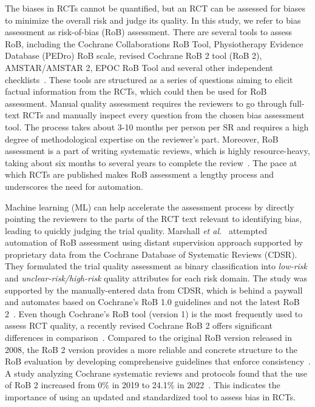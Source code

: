 \documentclass[sn-mathphys,Numbered]{sn-jnl}%
\theoremstyle{thmstyleone}%
\theoremstyle{thmstyletwo}%
\theoremstyle{thmstylethree}%
\begin{document}
The biases in RCTs cannot be quantified, but an RCT can be assessed for biases to minimize the overall risk and judge its quality.
In this study, we refer to bias assessment as risk-of-bias (RoB) assessment.
There are several tools to assess RoB, including the Cochrane Collaborations RoB Tool, Physiotherapy Evidence Database (PEDro) RoB scale, revised Cochrane RoB 2 tool (RoB 2), AMSTAR/AMSTAR 2, EPOC RoB Tool and several other independent checklists~\cite{higgins2011cochrane,elkins2013growth,sterne2019rob,shea2017amstar,farrah2019risk}.
These tools are structured as a series of questions aiming to elicit factual information from the RCTs, which could then be used for RoB assessment.
Manual quality assessment requires the reviewers to go through full-text RCTs and manually inspect every question from the chosen bias assessment tool.
The process takes about 3-10 months per person per SR and requires a high degree of methodological expertise on the reviewer's part.
Moreover, RoB assessment is a part of writing systematic reviews, which is highly resource-heavy, taking about six months to several years to complete the review~\cite{tsertsvadze2015conduct,khangura2012evidence,higgins2019cochrane}.
The pace at which RCTs are published makes RoB assessment a lengthy process and underscores the need for automation.



Machine learning (ML) can help accelerate the assessment process by directly pointing the reviewers to the parts of the RCT text relevant to identifying bias, leading to quickly judging the trial quality.
Marshall \textit{et al.}~\cite{marshall2015automating} attempted automation of RoB assessment using distant supervision approach supported by proprietary data from the Cochrane Database of Systematic Reviews (CDSR). 
They formulated the trial quality assessment as binary classification into \textit{low-risk} and \textit{unclear-risk/high-risk} quality attributes for each risk domain.
The study was supported by the manually-entered data from CDSR, which is behind a paywall and automates based on Cochrane's RoB 1.0 guidelines and not the latest RoB 2~\cite{higgins2011cochrane}.
Even though Cochrane's RoB tool (version 1) is the most frequently used to assess RCT quality, a recently revised Cochrane RoB 2 offers significant differences in comparison~\cite{ma2020methodological}.
Compared to the original RoB version released in 2008, the RoB 2 version provides a more reliable and concrete structure to the RoB evaluation by developing comprehensive guidelines that enforce consistency~\cite{higgins2011cochrane,sterne2019rob}.
A study analyzing Cochrane systematic reviews and protocols found that the use of RoB 2 increased from 0\% in 2019 to 24.1\% in 2022~\cite{martimbianco2023most}.
This indicates the importance of using an updated and standardized tool to assess bias in RCTs.
\end{document}
